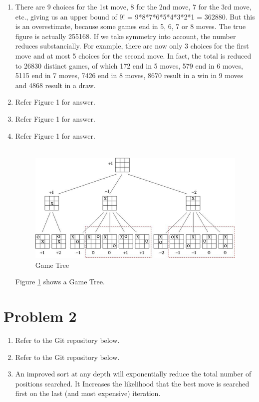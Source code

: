 \documentclass[12pt]{article}
\begin{document}
\begin{enumerate}[label=(\alph*)]
  \item  There are 9 choices for the 1st move, 8 for the 2nd move, 7 for the 3rd move, etc., giving us an upper bound of 9! = 9*8*7*6*5*4*3*2*1 = 362880. But this is an overestimate, because some games end in 5, 6, 7 or 8 moves. The true ﬁgure is actually 255168. If we take symmetry into account, the number reduces substancially. For example, there are now only 3 choices for the ﬁrst move and at most 5 choices for the second move. In fact, the total is reduced to 26830 distinct games, of which 172 end in 5 moves, 579 end in 6 moves, 5115 end in 7 moves, 7426 end in 8 moves, 8670 result in a win in 9 moves and 4868 result in a draw.

\item Refer Figure 1 for answer.

\item Refer Figure 1 for answer.

\item Refer Figure 1 for answer.
\\\\
\begin{figure}
  \includegraphics[width=\linewidth]{GameTree.png}
  \caption{Game Tree}
  \label{fig: Game_Tree}
\end{figure}

Figure \ref{fig: Game_Tree} shows a Game Tree.

\end{enumerate}
\section*{Problem 2}

\begin{enumerate}[label=(\alph*)]
  \item Refer to the Git repository below.

  \item Refer to the Git repository below.

 \item An improved sort at any depth will exponentially reduce the total number of positions searched. It Increases the likelihood that the best move is searched first on the last (and most expensive) iteration.

\end{enumerate}
\end{document}
